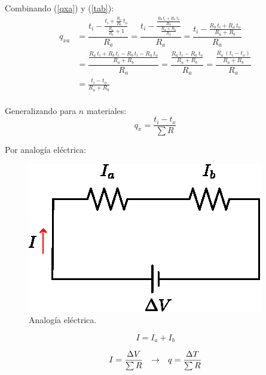 Combinando (\ref{qxa}) y (\ref{tab}):
\begin{equation*}
\begin{split}
    q_{xa}
        &=\dfrac{t_i-\frac{t_i+\frac{R_a}{R_b}\,t_o}{\frac{R_a}{R_b}+1}}{R_a}
         =\dfrac{t_i-\frac{\frac{R_b\,t_i+R_a\,t_o}{R_b}}{\frac{R_a+R_b}{R_b}}}
          {R_a}
         =\dfrac{t_i-\frac{R_b\,t_i+R_a\,t_o}{R_a+R_b}}{R_a}\\
        &=\dfrac{\frac{R_a\,t_i+R_b\,t_i-R_b\,t_i-R_a\,t_o}{R_a+R_b}}{R_a}
         =\dfrac{\frac{R_a\,t_i-R_a\,t_o}{R_a+R_b}}{R_a}
         =\dfrac{\frac{R_a\,(t_i-t_o)}{R_a+R_b}}{R_a}\\
        &=\frac{t_i-t_o}{R_a+R_b}\\
\end{split}
\end{equation*}

Generalizando para $n$ materiales:
\begin{equation}
    q_x=\frac{t_i-t_o}{\sum R}
\end{equation}

Por analogía eléctrica:
\begin{figure}[!h]
\centering
\includegraphics[scale=1.00]{figura02_07.eps}
\caption{Analogía eléctrica.}
\end{figure}

\begin{equation*}
    I=I_a+I_b
\end{equation*}

\begin{equation*}
\def\arraystretch{1.4}
\begin{array}{@{}cll@{}}
I=\dfrac{\Delta V}{\sum R} & \rightarrow & q=\dfrac{\Delta T}{\sum R} \\
\end{array}
\end{equation*}

